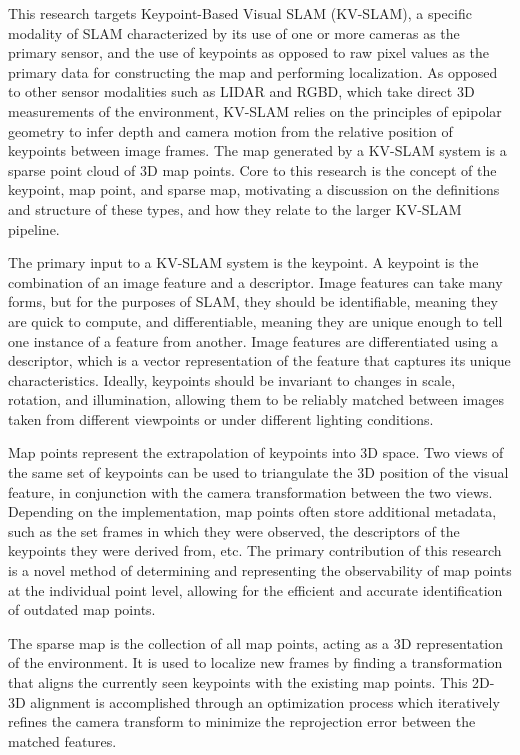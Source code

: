This research targets Keypoint-Based Visual SLAM (KV-SLAM), a specific modality of SLAM characterized by its use of one or more cameras as the primary sensor, and the use of keypoints as opposed to raw pixel values as the primary data for constructing the map and performing localization. As opposed to other sensor modalities such as LIDAR and RGBD, which take direct 3D measurements of the environment, KV-SLAM relies on the principles of epipolar geometry to infer depth and camera motion from the relative position of keypoints between image frames. The map generated by a KV-SLAM system is a sparse point cloud of 3D map points. Core to this research is the concept of the keypoint, map point, and sparse map, motivating a discussion on the definitions and structure of these types, and how they relate to the larger KV-SLAM pipeline.


The primary input to a KV-SLAM system is the keypoint. A keypoint is the combination of an image feature and a descriptor. Image features can take many forms, but for the purposes of SLAM, they should be identifiable, meaning they are quick to compute, and differentiable, meaning they are unique enough to tell one instance of a feature from another. Image features are differentiated using a descriptor, which is a vector representation of the feature that captures its unique characteristics. Ideally, keypoints should be invariant to changes in scale, rotation, and illumination, allowing them to be reliably matched between images taken from different viewpoints or under different lighting conditions.

Map points represent the extrapolation of keypoints into 3D space. Two views of the same set of keypoints can be used to triangulate the 3D position of the visual feature, in conjunction with the camera transformation between the two views. Depending on the implementation, map points often store additional metadata, such as the set frames in which they were observed, the descriptors of the keypoints they were derived from, etc. The primary contribution of this research is a novel method of determining and representing the observability of map points at the individual point level, allowing for the efficient and accurate identification of outdated map points.

The sparse map is the collection of all map points, acting as a 3D representation of the environment. It is used to localize new frames by finding a transformation that aligns the currently seen keypoints with the existing map points. This 2D-3D alignment is accomplished through an optimization process which iteratively refines the camera transform to minimize the reprojection error between the matched features.

